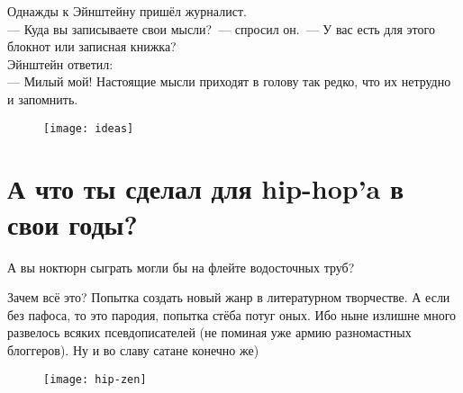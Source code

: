 \vfill

\newpage

\begin{epigraph}
Однажды к Эйнштейну пришёл журналист.\\
--- Куда вы записываете свои мысли?~--- спросил он.~--- У вас есть для этого блокнот или записная книжка?\\

Эйнштейн ответил:\\
--- Милый мой! Настоящие мысли приходят в голову так редко, что их нетрудно и запомнить.
\end{epigraph}

\begin{figure}[ht!]
    \centering
    \texttt{[image: ideas]}
\end{figure}

\newpage

\section*{А что ты сделал для hip-hop'a в свои годы?}\label{section:one}
\begin{epigraph}
    А вы ноктюрн сыграть могли бы на флейте водосточных труб?
\end{epigraph}

Зачем всё это? Попытка создать новый жанр в литературном творчестве.
А если без пафоса, то это пародия, попытка стёба потуг оных. Ибо ныне излишне много развелось всяких псевдописателей (не поминая уже армию разномастных блоггеров).
Ну и во славу сатане конечно же)
\begin{figure}[ht!]
    \centering
    \texttt{[image: hip-zen]}
\end{figure}
